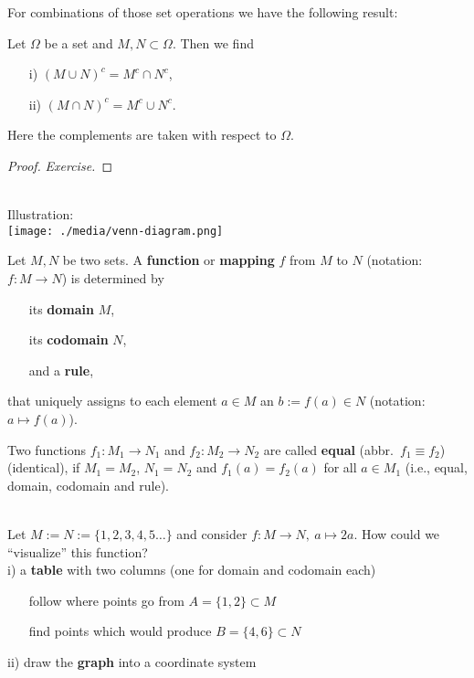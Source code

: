 \begin{frame}
For combinations of those set operations we have the following result: \vspace{-0.2cm}
 \begin{lemma}\label{lem:demorgan}
 	Let $\Omega$ be a set and $M,N \subset \Omega$. Then we find
 	\begin{itemize}
 		\item[i)] $ (M\cup N)^c  = M^c \cap N^c $,
 		\item[ii)] $ (M\cap N )^c =  M^c \cup  N^c $.
 	\end{itemize}
 Here the complements are taken with respect to $\Omega$.
 \end{lemma}\vspace{-0.5cm}
 \begin{proof}
 	\textit{Exercise.}
 \end{proof}
{
	\blank
	~\\
	Illustration:\\
	\texttt{[image: ./media/venn-diagram.png]}
}
\end{frame}
 
\begin{frame}
\begin{defi}\label{def:function}
	Let $M, N$ be two sets. A \textbf{function} or \textbf{mapping} $f$ from $M$ to $N$ (notation: $f\colon M\to N$) is determined by
	\begin{itemize}
		\item[] its \textbf{domain} $M$, 
		\item[] its \textbf{codomain} $N$,
		\item[] and a \textbf{rule},
	\end{itemize} 
that uniquely assigns to each element $a\in M$ an $b:=f(a)\in N$ (notation: $a \mapsto f(a)$).	 
\end{defi}
Two functions $f_1: M_1\to N_1$ and $f_2: M_2\to N_2$ are called \textbf{equal} (abbr.~$f_1\equiv f_2$) (identical),
if $M_1=M_2$, $N_1=N_2$ and $f_1(a)=f_2(a)$ for all $a\in M_1$ (i.e., equal, domain, codomain and rule).
%
	
\vspace{0.4cm}
\begin{ex}\label{ex:image_preimage_graph}
	~\\
	\blank
	Let $M := N :=\{1,2,3,4,5\ldots\}$ and consider $f\colon M \to N,~ a \mapsto 2a$. How could we ``visualize'' this function?\\ \vspace{0.2cm}
	i) a \textbf{table} with two columns (one for domain and codomain each)
	\begin{itemize}
		\blank
		\item[] follow where points go from $A=\{1,2\}\subset M$ 
		\item[] find points which would produce $B=\{4,6\} \subset N$
	\end{itemize}\vspace{0.2cm}
	ii) draw the \textbf{graph} into a coordinate system
\end{ex}
\end{frame}

